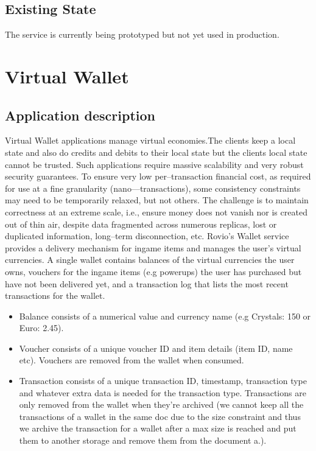 \documentclass[11pt,a4paper]{report}
\begin{document}
\subsection{Existing State}
The service is currently being prototyped but not yet used in production.

\section{Virtual Wallet}
\subsection{Application description}
Virtual Wallet applications manage virtual economies.The clients keep a local state and also do credits and debits to their local state but the clients local state cannot be trusted.  Such applications require massive scalability and very robust security guarantees. To ensure very low per--transaction financial cost, as required for use at a ﬁne granularity (nano---transactions), some consistency constraints may need to be temporarily relaxed, but not others. The challenge is to maintain correctness at an extreme scale, i.e., ensure money does not vanish nor is created out of thin air, despite data fragmented across numerous replicas, lost or duplicated information, long­--term disconnection, etc.
Rovio's Wallet service provides a delivery mechanism for in­game items and manages the user's virtual currencies. A single wallet contains balances of the virtual currencies the user owns, vouchers for the in­game items (e.g power­ups) the user has purchased but have not been delivered yet, and a transaction log that lists the most recent transactions for the wallet.

\begin{itemize}
\item Balance consists of a numerical value and currency name (e.g Crystals: 150 or Euro: 2.45).
\item Voucher consists of a unique voucher ID and item details (item ID, name etc). Vouchers are removed from the wallet when consumed.
\item Transaction consists of a unique transaction ID, timestamp, transaction type and whatever extra data is needed for the transaction type. Transactions are only removed from the wallet when they're archived (we cannot keep all the transactions of a wallet in the same doc due to the size constraint and thus we archive the transaction for a wallet after a max size is reached and put them to another storage and remove them from the document a.).
\end{itemize}
\end{document}
